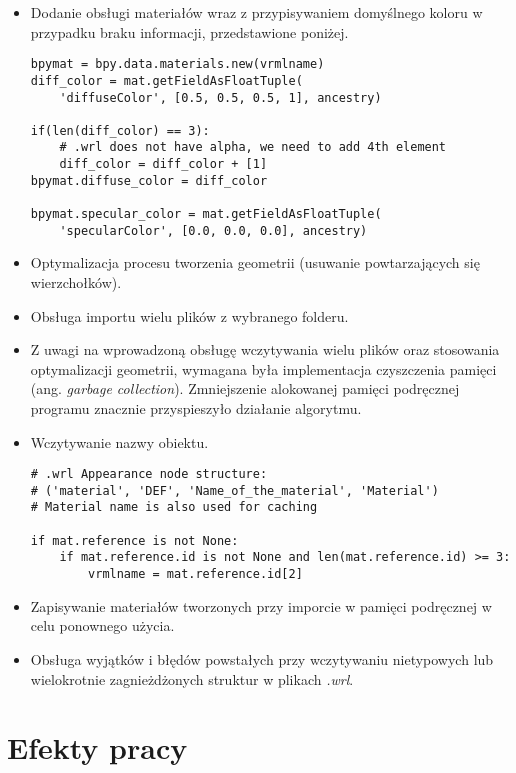 \documentclass{xmgr}
\begin{document}
\begin{itemize}
\item Dodanie obsługi materiałów wraz z przypisywaniem domyślnego koloru w przypadku braku informacji, przedstawione poniżej.
\begin{lstlisting}
bpymat = bpy.data.materials.new(vrmlname)
diff_color = mat.getFieldAsFloatTuple(
	'diffuseColor', [0.5, 0.5, 0.5, 1], ancestry)

if(len(diff_color) == 3):
    # .wrl does not have alpha, we need to add 4th element
    diff_color = diff_color + [1]
bpymat.diffuse_color = diff_color

bpymat.specular_color = mat.getFieldAsFloatTuple(
	'specularColor', [0.0, 0.0, 0.0], ancestry)
\end{lstlisting}
\item Optymalizacja procesu tworzenia geometrii (usuwanie powtarzających się wierzchołków).
\item Obsługa importu wielu plików z wybranego folderu.
\item Z uwagi na wprowadzoną obsługę wczytywania wielu plików oraz stosowania optymalizacji geometrii, wymagana była implementacja czyszczenia pamięci (ang. \emph{garbage collection}). Zmniejszenie alokowanej pamięci podręcznej programu znacznie przyspieszyło działanie algorytmu.
\item Wczytywanie nazwy obiektu.
\begin{lstlisting}
# .wrl Appearance node structure:
# ('material', 'DEF', 'Name_of_the_material', 'Material')
# Material name is also used for caching

if mat.reference is not None:
    if mat.reference.id is not None and len(mat.reference.id) >= 3:
        vrmlname = mat.reference.id[2]
\end{lstlisting}
\item Zapisywanie materiałów tworzonych przy imporcie w pamięci podręcznej w celu ponownego użycia.
\item Obsługa wyjątków i błędów powstałych przy wczytywaniu nietypowych lub wielokrotnie zagnieżdżonych struktur w plikach \emph{.wrl}.

\end{itemize}

\chapter{Efekty pracy}
\end{document}
